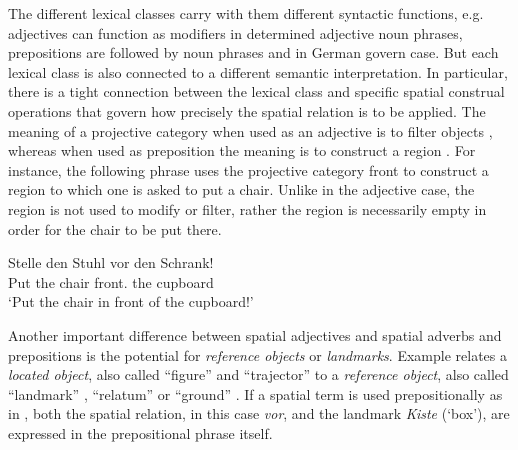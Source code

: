 The different lexical classes carry with them different 
syntactic functions, e.g. adjectives can function as modifiers
in determined adjective noun phrases, prepositions are followed
by noun phrases and in German govern case.  
But each lexical class is also connected 
to a different semantic interpretation. In particular, there is 
a tight connection between the lexical class and specific spatial 
construal operations that govern how precisely the spatial relation is
to be applied. The meaning
of a projective category when used as an adjective is to filter objects 
\citep{tenbrink2007space}, whereas when used as preposition the 
meaning is to construct a region \citep{klabunde1999logic}. 
For instance, the following phrase  uses the projective category
front to construct a region to which one is asked to put a chair. 
Unlike in the adjective case, the region is not used to modify
or filter, rather the region is necessarily empty in order for the chair to be put there. 

\ea
\label{e:stelle-den-stuhl-vor-den-schrank}
\gll Stelle den Stuhl vor den Schrank!\\
Put the chair front.{\PREP} the cupboard\\
\glt `Put the chair in front of the cupboard!'\\
\z

Another important difference between spatial adjectives and spatial adverbs and prepositions is the potential
for \emph{reference objects} or \emph{landmarks}. Example 
 relates a \emph{located object}, also called
``figure'' \citep{talmy2000toward2} and ``trajector'' \citep{vandeloise1991spatial}
to a \emph{reference object}, also called ``landmark'' \citep{vandeloise1991spatial}, 
``relatum'' \citep{tenbrink2007space} or ``ground'' \citep{talmy2000toward2}.
If a spatial term is used prepositionally as in 
, both the spatial relation, in this case 
\textit{vor}, and the landmark \textit{Kiste} (`box'), are expressed in the 
prepositional phrase itself. 

